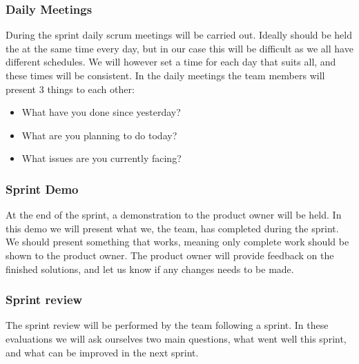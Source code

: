 \subsubsection{Daily Meetings}
During the sprint daily scrum meetings will be carried out. Ideally should be held the at the same time every day, but in our case this will be difficult as we all have different schedules. We will however set a time for each day that suits all, and these times will be consistent. In the daily meetings the team members will present 3 things to each other:
\begin{itemize}
\item What have you done since yesterday?
\item What are you planning to do today?
\item What issues are you currently facing?
\end{itemize}

\subsubsection{Sprint Demo}
At the end of the sprint, a demonstration to the product owner will be held. In this demo we will present what we, the team, has completed during the sprint. We should present something that works, meaning only complete work should be shown to the product owner. The product owner will provide feedback on the finished solutions, and let us know if any changes needs to be made.

\subsubsection{Sprint review}
The sprint review will be performed by the team following a sprint. In these evaluations we will ask ourselves two main questions, what went well this sprint, and what can be improved in the next sprint.


